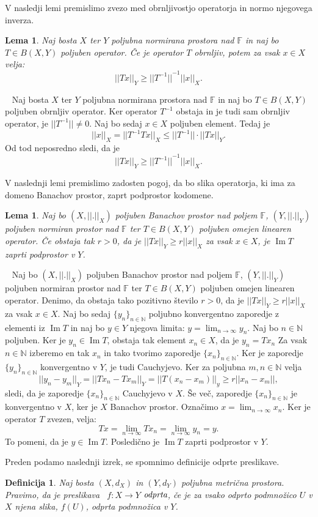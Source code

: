 \documentclass[12pt,a4paper,oneside,fleqn,openany]{book}
\newtheorem{lema}[izrek]{Lema}
\newtheorem{definicija}[izrek]{Definicija}
\newcommand{\eopf}{\raisebox{0.8ex}{\framebox{}}} %
\newenvironment{dokaz}%
{\noindent{\bf Dokaz.}\ }%
{\hfill\eopf\par\bigskip}%
\newcommand{\F}{\mathbb{F}}
\newcommand{\N}{\mathbb{N}}
\newcommand{\abs}[1]{\ensuremath{\lvert #1 \rvert}}
\newcommand{\norm}[1]{\abs{\abs{#1}}}
\newcommand{\pojem}[1]{\ensuremath{\emph{#1}}}
\newcommand{\map}[3]{\ensuremath{{#1}:{#2}\rightarrow{#3}}}
\begin{document}
V nasledji lemi premislimo zvezo med obrnljivostjo operatorja in normo njegovega inverza.
\begin{lema}
	\label{lem:invnorm}
	Naj bosta $X$ ter $Y$ poljubna normirana prostora nad $\F$ in naj bo $T\in B(X, Y)$ poljuben operator. Če je operator $T$ obrnljiv, potem za vsak $x\in X$ velja: $$\norm{Tx}_Y\geq \norm{T^{-1}}^{-1}\norm{x}_X.$$
\end{lema}
\begin{dokaz}
	Naj bosta $X$ ter $Y$ poljubna normirana prostora nad $\F$ in naj bo $T\in B(X, Y)$ poljuben obrnljiv operator. Ker operator $T^{-1}$ obstaja in je tudi sam obrnljiv operator, je $\norm{T^{-1}}\neq 0$. Naj bo sedaj $x\in X$ poljuben element. Tedaj je $$\norm{x}_X=\norm{T^{-1}Tx}_X \leq \norm{T^{-1}}\cdot\norm{Tx}_Y.$$ Od tod neposredno sledi, da je $$\norm{Tx}_Y \geq\norm{T^{-1}}^{-1}\norm{x}_X.$$
\end{dokaz}
V naslednji lemi premislimo zadosten pogoj, da bo slika operatorja, ki ima za domeno Banachov prostor, zaprt podprostor kodomene.
\begin{lema}
	\label{lem:banzap}
	Naj bo $(X,\norm{.}_X)$ poljuben Banachov prostor nad poljem $\F$, $(Y,\norm{.}_Y)$ poljuben normiran prostor nad $\F$ ter $T\in B(X, Y)$ poljuben omejen linearen operator. Če obstaja tak $r>0$, da je $\norm{Tx}_Y\geq r\norm{x}_X$ za vsak $x\in X$, je $\operatorname{Im}T$ zaprti podprostor v $Y$.
\end{lema}
\begin{dokaz}
	Naj bo $(X,\norm{.}_X)$ poljuben Banachov prostor nad poljem $\F$, $(Y,\norm{.}_Y)$ poljuben normiran prostor nad $\F$ ter $T\in B(X, Y)$ poljuben omejen linearen operator. Denimo, da obstaja tako pozitivno število $r>0$, da je $\norm{Tx}_Y\geq r\norm{x}_X$ za vsak $x\in X$. Naj bo sedaj $\{y_n\}_{n\in\N}$ poljubno konvergentno zaporedje z elementi iz $\operatorname{Im}T$ in naj bo $y\in Y$ njegova limita: $y = \lim_{n\to \infty}y_n$. Naj bo $n\in\N$ poljuben. Ker je $y_n\in \operatorname{Im}T$, obstaja tak element $x_n\in X$, da je $y_n = Tx_n$ Za vsak $n\in\N$ izberemo en tak $x_n$ in tako tvorimo zaporedje $\{x_n\}_{n\in\N}$. Ker je zaporedje $\{y_n\}_{n\in\N}$ konvergentno v $Y$, je tudi Cauchyjevo. Ker za poljubna $m, n\in\N$ velja $$\norm{y_n - y_m}_Y = \norm{Tx_n - Tx_m}_Y = \norm{T(x_n - x_m)}_y\geq r\norm{x_n - x_m},$$ sledi, da je zaporedje $\{x_n\}_{n\in\N}$ Cauchyjevo v $X$. Še več, zaporedje $\{x_n\}_{n\in\N}$ je konvergentno v $X$, ker je $X$ Banachov prostor. Označimo $x=\lim_{n\to\infty}x_n$. Ker je operator $T$ zvezen, velja: $$Tx = \lim_{n\to \infty}Tx_n = \lim_{n\to\infty}y_n = y.$$ To pomeni, da je $y\in\operatorname{Im}T$. Posledično je $\operatorname{Im}T$ zaprti podprostor v $Y$.
\end{dokaz}
Preden podamo naslednji izrek, se spomnimo definicije odprte preslikave.
\begin{definicija}
	\label{def:odppresl}
	Naj bosta $(X, d_X)$ in $(Y, d_Y)$ poljubna metrična prostora. Pravimo, da je preslikava ~$\map{f}{X}{Y}$ \pojem{odprta}, če je za vsako odprto podmnožico $U$ v $X$ njena slika, $f(U)$, odprta podmnožica v $Y$.
\end{definicija}
\end{document}

